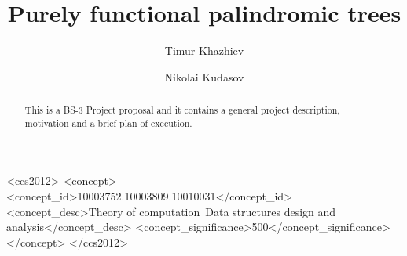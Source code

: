 \documentclass[sigconf]{acmart}
\begin{document}
\title{Purely functional palindromic trees}


\author{Timur Khazhiev}

\author{Nikolai Kudasov}

\begin{abstract}
  This is a BS-3 Project proposal and it contains
  a general project description, motivation and
  a brief plan of execution.
\end{abstract}

%
%
\begin{CCSXML}
<ccs2012>
<concept>
<concept_id>10003752.10003809.10010031</concept_id>
<concept_desc>Theory of computation~Data structures design and analysis</concept_desc>
<concept_significance>500</concept_significance>
</concept>
</ccs2012>
\end{CCSXML}



\maketitle





\end{document}
